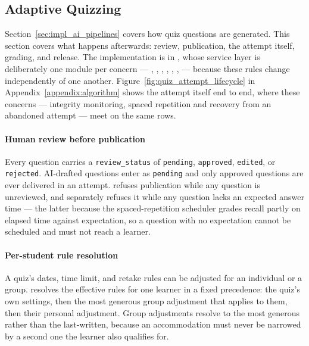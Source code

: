﻿\subsection{Adaptive Quizzing}
\label{sec:impl_quizzing}

Section~\ref{sec:impl_ai_pipelines} covers how quiz questions are generated. This section covers what happens afterwards: review, publication, the attempt itself, grading, and release. The implementation is in , whose service layer is deliberately one module per concern --- , , , , , ,  --- because these rules change independently of one another. Figure~\ref{fig:quiz_attempt_lifecycle} in Appendix~\ref{appendix:algorithm} shows the attempt itself end to end, where these concerns --- integrity monitoring, spaced repetition and recovery from an abandoned attempt --- meet on the same rows.

\paragraph{Human review before publication}
Every question carries a \texttt{review\_status} of \texttt{pending}, \texttt{approved}, \texttt{edited}, or \texttt{rejected}. AI-drafted questions enter as \texttt{pending} and only approved questions are ever delivered in an attempt.  refuses publication while any question is unreviewed, and separately refuses it while any question lacks an expected answer time --- the latter because the spaced-repetition scheduler grades recall partly on elapsed time against expectation, so a question with no expectation cannot be scheduled and must not reach a learner.

\paragraph{Per-student rule resolution}
A quiz's dates, time limit, and retake rules can be adjusted for an individual or a group.  resolves the effective rules for one learner in a fixed precedence: the quiz's own settings, then the most generous group adjustment that applies to them, then their personal adjustment. Group adjustments resolve to the most generous rather than the last-written, because an accommodation must never be narrowed by a second one the learner also qualifies for.

